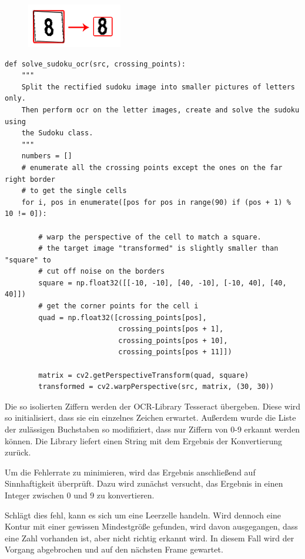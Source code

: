 \begin{figure}[H]
    \begin{center}
        \includegraphics{Abbildungen/Ziffer}
    \end{center}
\end{figure}

\begin{lstlisting}
def solve_sudoku_ocr(src, crossing_points):
    """
    Split the rectified sudoku image into smaller pictures of letters only.
    Then perform ocr on the letter images, create and solve the sudoku using
    the Sudoku class.
    """
    numbers = []
    # enumerate all the crossing points except the ones on the far right border
    # to get the single cells
    for i, pos in enumerate([pos for pos in range(90) if (pos + 1) % 10 != 0]):

        # warp the perspective of the cell to match a square.
        # the target image "transformed" is slightly smaller than "square" to
        # cut off noise on the borders
        square = np.float32([[-10, -10], [40, -10], [-10, 40], [40, 40]])
        # get the corner points for the cell i
        quad = np.float32([crossing_points[pos],
                           crossing_points[pos + 1],
                           crossing_points[pos + 10],
                           crossing_points[pos + 11]])

        matrix = cv2.getPerspectiveTransform(quad, square)
        transformed = cv2.warpPerspective(src, matrix, (30, 30))
\end{lstlisting}

Die so isolierten Ziffern werden der OCR-Library Tesseract übergeben.
Diese wird so initialisiert, dass sie ein einzelnes Zeichen erwartet. Außerdem wurde die Liste der zulässigen Buchstaben so modifiziert, dass nur Ziffern von 0-9 erkannt werden können.
Die Library liefert einen String mit dem Ergebnis der Konvertierung zurück.

Um die Fehlerrate zu minimieren, wird das Ergebnis anschließend auf Sinnhaftigkeit überprüft.
Dazu wird zunächst versucht, das Ergebnis in einen Integer zwischen 0 und 9 zu konvertieren.

Schlägt dies fehl, kann es sich um eine Leerzelle handeln.
Wird dennoch eine Kontur mit einer gewissen Mindestgröße gefunden, wird davon ausgegangen, dass eine Zahl vorhanden ist, aber nicht richtig erkannt wird.
In diesem Fall wird der Vorgang abgebrochen und auf den nächsten Frame gewartet.

